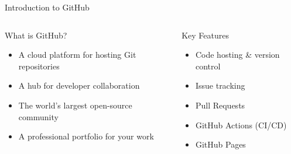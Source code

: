 \documentclass[aspectratio=169]{beamer}
\begin{document}
\begin{frame}{Introduction to GitHub}
  \begin{columns}
    \begin{column}{0.5\textwidth}
      \begin{block}{What is GitHub?}
        \begin{itemize}
          \item A cloud platform for hosting Git repositories
          \item A hub for developer collaboration
          \item The world's largest open-source community
          \item A professional portfolio for your work
        \end{itemize}
      \end{block}
    \end{column}
    \begin{column}{0.48\textwidth}
      \begin{block}{Key Features}
        \begin{itemize}
          \item Code hosting \& version control
          \item Issue tracking
          \item Pull Requests
          \item GitHub Actions (CI/CD)
          \item GitHub Pages
        \end{itemize}
      \end{block}
    \end{column}
  \end{columns}
\end{frame}
\end{document}

